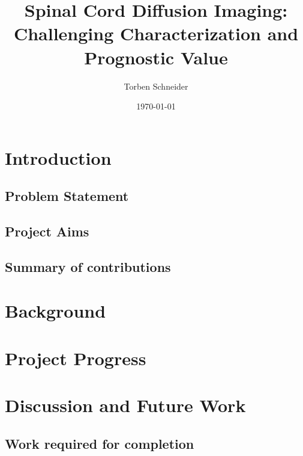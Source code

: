 \documentclass[a4paper]{scrreprt}
\begin{document}
 
\title{Spinal Cord Diffusion Imaging: Challenging Characterization and Prognostic Value} 
\date{\today} 
\author{Torben Schneider} 
\maketitle 
\chapter{Introduction}
	\section{Problem Statement}
	\section{Project Aims}
	\section{Summary of contributions}
\chapter{Background} 
 
\chapter{Project Progress}
 

\chapter{Discussion and Future Work}
	\section{Work required for completion}
\end{document}
